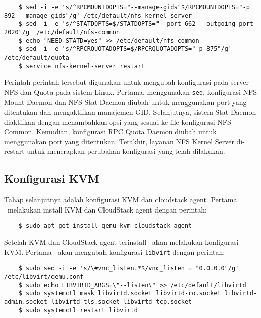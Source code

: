 \begin{listing}[H]
    \begin{verbatim} 
    $ sed -i -e 's/^RPCMOUNTDOPTS="--manage-gids"$/RPCMOUNTDOPTS="-p 892 --manage-gids"/g' /etc/default/nfs-kernel-server
    $ sed -i -e 's/^STATDOPTS=$/STATDOPTS="--port 662 --outgoing-port 2020"/g' /etc/default/nfs-common
    $ echo "NEED_STATD=yes" >> /etc/default/nfs-common
    $ sed -i -e 's/^RPCRQUOTADOPTS=$/RPCRQUOTADOPTS="-p 875"/g' /etc/default/quota
    $ service nfs-kernel-server restart
    \end{verbatim}
\end{listing}

Perintah-perintah tersebut digunakan untuk mengubah konfigurasi pada server NFS dan Quota pada sistem Linux. Pertama, menggunakan \texttt{sed}, konfigurasi NFS Mount Daemon dan NFS Stat Daemon diubah untuk menggunakan port yang ditentukan dan mengaktifkan manajemen GID. Selanjutnya, sistem Stat Daemon diaktifkan dengan menambahkan opsi yang sesuai ke file konfigurasi NFS Common. Kemudian, konfigurasi RPC Quota Daemon diubah untuk menggunakan port yang ditentukan. Terakhir, layanan NFS Kernel Server di-restart untuk menerapkan perubahan konfigurasi yang telah dilakukan.

\subsection{Konfigurasi KVM}
Tahap selanjutnya adalah konfigurasi KVM dan cloudstack agent. Pertama \saya\ melakukan install KVM dan CloudStack agent dengan perintah:

\begin{listing}[H]
    \begin{verbatim}       
    $ sudo apt-get install qemu-kvm cloudstack-agent
    \end{verbatim}
\end{listing}

Setelah KVM dan CloudStack agent terinstall \saya\ akan melakukan konfigurasi KVM. Pertama \saya\ akan mengubah konfigurasi \texttt{libvirt} dengan perintah:

\begin{listing}[H]
    \begin{verbatim}       
    $ sudo sed -i -e 's/\#vnc_listen.*$/vnc_listen = "0.0.0.0"/g' /etc/libvirt/qemu.conf
    $ sudo echo LIBVIRTD_ARGS=\"--listen\" >> /etc/default/libvirtd
    $ sudo systemctl mask libvirtd.socket libvirtd-ro.socket libvirtd-admin.socket libvirtd-tls.socket libvirtd-tcp.socket
    $ sudo systemctl restart libvirtd
    \end{verbatim}
\end{listing}

